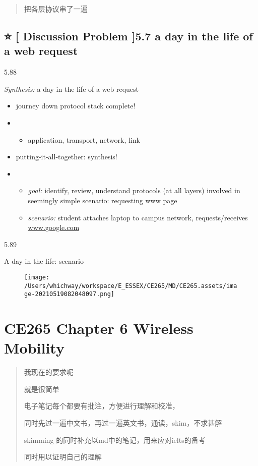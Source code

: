 \documentclass[
]{article}
\begin{document}
\begin{quote}
把各层协议串了一遍
\end{quote}

\hypertarget{--discussion-problem-57-a-day-in-the-life-of-a-web-request}{%
\subsection{⭐️ {[} Discussion Problem {]}5.7 a day in the life of a web
request}\label{--discussion-problem-57-a-day-in-the-life-of-a-web-request}}

5.88

\emph{Synthesis:} a day in the life of a web request

\begin{itemize}
\item
  journey down protocol stack complete!
\item
  \begin{itemize}
  \item
    application, transport, network, link
  \end{itemize}
\item
  putting-it-all-together: synthesis!
\item
  \begin{itemize}
  \item
    \emph{goal:} identify, review, understand protocols (at all layers)
    involved in seemingly simple scenario: requesting www page
  \item
    \emph{scenario:} student attaches laptop to campus network,
    requests/receives \url{www.google.com}
  \end{itemize}
\end{itemize}

5.89

A day in the life: scenario

\begin{figure}
\centering
\texttt{[image: /Users/whichway/workspace/E\_ESSEX/CE265/MD/CE265.assets/image-20210519082048097.png]}
\caption{}
\end{figure}

\hypertarget{ce265-chapter-6-wireless-mobility}{%
\section{CE265 Chapter 6 Wireless
Mobility}\label{ce265-chapter-6-wireless-mobility}}

\begin{quote}
我现在的要求呢

就是很简单

电子笔记每个都要有批注，方便进行理解和校准，

同时先过一遍中文书，再过一遍英文书，通读，skim，不求甚解

skimming 的同时补充以md中的笔记，用来应对ielts的备考

同时用以证明自己的理解
\end{quote}
\end{document}
